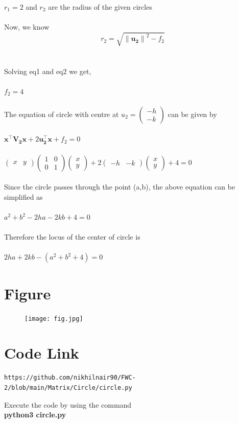 \documentclass[journal,12pt,twocolumn]{IEEEtran}
\newcommand{\myvec}[1]{\ensuremath{\begin{pmatrix}#1\end{pmatrix}}}
\let\vec\mathbf
\begin{document}
$r_1=2$ and $r_2$ are the radius of the given circles
\\
\\
Now, we know
\begin{equation}
r_2=\sqrt {{\lVert \vec{u_2} \rVert}^2 - f_2}
\end{equation}             \label{eq-2}
\\
\\
Solving eq1 and eq2 we get,\\
\\
$f_2 = 4$
\\
\\
The equation of circle with centre at $u_2 =\myvec{-h \\ -k}$ can be given by\\
\\
${\vec{x^{\top}V_2 x} + 2\vec{u_2^{\top}x}} + f_2=0$
\\
\\
$\myvec{x & y}\myvec{1&0\\ 0&1}\myvec{x\\y} + 2\myvec{-h & -k}\myvec{x\\y} + 4 = 0$
\\
\\
Since the circle passes through the point (a,b), the above equation can be simplified as
\\
\\
$a^2 + b^2 -2ha - 2kb +4 =0 $
\\  
\\
Therefore the locus of the center of circle is
\\
\\
$2ha + 2kb - (a^2 + b^2 + 4) = 0$

\section{\textbf{Figure}}
\begin{figure}[h]
    \centering
\texttt{[image: fig.jpg]}
    \label{fig:my_label}
\end{figure}


\section{\textbf{Code Link}}

\begin{lstlisting}
https://github.com/nikhilnair90/FWC-2/blob/main/Matrix/Circle/circle.py
\end{lstlisting}
Execute the code by using the command\\
\textbf{python3 circle.py}
\end{document}
